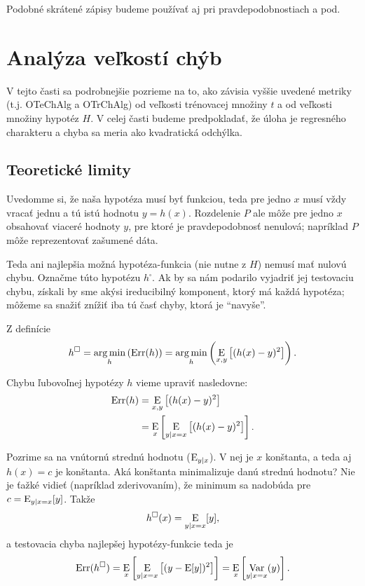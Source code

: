 Podobné skrátené zápisy budeme používať aj pri pravdepodobnostiach
a pod.




\section{Analýza veľkostí chýb}

V tejto časti sa podrobnejšie pozrieme na to, ako závisia vyššie
uvedené metriky (t.j. OTeChAlg a OTrChAlg) od veľkosti trénovacej množiny
$t$ a od veľkosti množiny hypotéz $H$. V celej časti budeme predpokladať,
že úloha je regresného charakteru a chyba sa meria ako kvadratická odchýlka.



\subsection{Teoretické limity}

Uvedomme si, že naša hypotéza musí byť funkciou, teda pre jedno $x$
musí vždy vracať jednu a tú istú hodnotu $y = h(x)$. Rozdelenie $P$ ale
môže pre jedno $x$ obsahovať viaceré hodnoty $y$, pre ktoré je pravdepodobnosť
nenulová; napríklad $P$ môže reprezentovať zašumené dáta.

Teda ani najlepšia možná hypotéza-funkcia (nie nutne z $H$) nemusí
mať nulovú chybu. Označme túto hypotézu $h^\square$. Ak by sa nám
podarilo vyjadriť jej testovaciu chybu, získali by sme akýsi ireducibilný
komponent, ktorý má každá hypotéza; môžeme sa snažiť znížiť iba tú časť
chyby, ktorá je ``navyše''.

Z definície
$$h^{\square} = \operatorname*{{arg\,min}}_h \left( \mathrm{Err}(h) \right) = \operatorname*{{arg\,min}}_h \left( \operatorname*{\mathrm{E}}_{x,y} \left[ (h(x) - y)^2 \right] \right).$$

Chybu ľubovoľnej hypotézy $h$ vieme upraviť nasledovne:
\begin{align}
  \mathrm{Err}(h)
    &= \operatorname*{\mathrm{E}}_{x,y} \left[ (h(x) - y)^2 \right] \\
    &= \operatorname*{\mathrm{E}}_x \left[ \operatorname*{\mathrm{E}}_{y|x=x} \left[ (h(x) - y)^2 \right] \right].
\end{align}

Pozrime sa na vnútornú strednú hodnotu ($\operatorname*{\mathrm{E}}_{y|x}$). V nej je $x$ konštanta, a
teda aj $h(x) = c$ je konštanta. Aká konštanta minimalizuje danú
strednú hodnotu? Nie je ťažké vidieť (napríklad zderivovaním), že
minimum sa nadobúda pre $c = \operatorname*{\mathrm{E}}_{y|x=x}[y]$. Takže
$$h^{\square}(x) = \operatorname*{\mathrm{E}}_{y|x=x}[y],$$
a testovacia chyba najlepšej hypotézy-funkcie teda je
$$\mathrm{Err}(h^{\square}) = \operatorname*{\mathrm{E}}_{x} \left[ \operatorname*{\mathrm{E}}_{y|x=x} \left[ (y - \operatorname*{\mathrm{E}}[y])^2 \right] \right] = \operatorname*{\mathrm{E}}_{x} \left[ \operatorname*{\mathrm{Var}}_{y|x=x}(y) \right].$$



